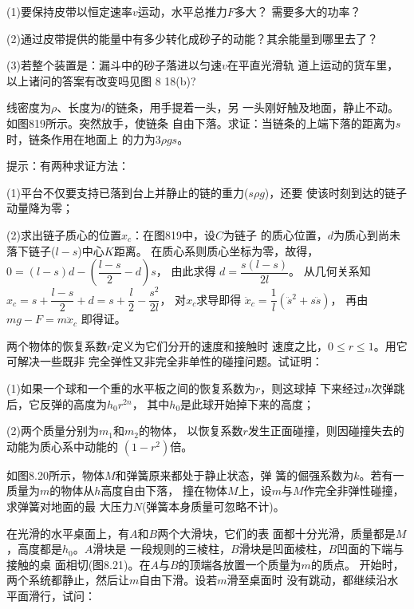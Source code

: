 \begin{exercises}
(1)要保持皮带以恒定速率$ v $运动，水平总推力$ F $多大？
需要多大的功率？

(2)通过皮带提供的能量中有多少转化成砂子的动能？其余能量到哪里去了？

(3)若整个装置是：漏斗中的砂子落进以匀速$ v $在平直光滑轨
道上运动的货车里，以上诸问的答案有改变吗\lhbrak 见图 8 18(b)\rhbrak ?

\exercise 线密度为$ \rho $、长度为$ l $的链条，用手提着一头，另
一头刚好触及地面，静止不动。如图819所示。突然放手，使链条
自由下落。求证：当链条的上端下落的距离为$ s $时，链条作用在地面上
的力为$ 3 \rho g s $。

\rhbrak 提示：有两种求证方法：

(1)平台不仅要支持已落到台上并静止的链的重力($ s \rho g $)，还要
使该时刻到达的链子动量降为零；

(2)求出链子质心的位置$ x _ { c } $：在图819中，设$ C $为链子
的质心位置，$ d $为质心到尚未落下链子($ l - s $)中心$ K $距离。
在质心系则质心坐标为零，故得，
$ 0 = \left( l - s \right) d - \left( \dfrac { l - s } { 2 } -d \right) s $，
由此求得
$ d = \dfrac { s \left( l - s \right) } { 2 l } $。
从几何关系知
$ x _ { c } = s + \dfrac { l - s } { 2 } + d = s + \dfrac { l } { 2 } - \dfrac { s ^ { 2 } } { 2 l } $，
对$ x _ { c } $求导即得
$ \ddot { x } _ { c } = \dfrac { 1 } { l }\left( \ddot { s } ^ 2 + s \ddot { s } \right)$，
再由$ m g - F = m \ddot { x } _ { c }$ 即得证\rhbrak 。

\exercise 两个物体的恢复系数$ r $定义为它们分开的速度和接触时
速度之比，$ 0 \leqslant r \leqslant 1 $。用它可解决一些既非
完全弹性又非完全非单性的碰撞问题。试证明：

(1)如果一个球和一个重的水平板之间的恢复系数为$ r $，则这球掉
下来经过$ n $次弹跳后，它反弹的高度为$ h _ { 0 } r ^ { 2 n } $，
其中$ h _ { 0 } $是此球开始掉下来的高度；

(2)两个质量分别为$ m _ { 1 } $和$ m _  { 2 } $的物体，
以恢复系数$ r $发生正面碰撞，则因碰撞失去的动能为质心系中动能的
$ \left( 1 - r ^ { 2 } \right) $倍。

\exercise 如图8.20所示，物体$ M $和弹簧原来都处于静止状态，弹
簧的倔强系数为$ k $。若有一质量为$ m $的物体从$ h $高度自由下落，
撞在物体$ M $上，设$ m $与$ M $作完全非弹性碰撞，求弹簧对地面的最
大压力$ N $(弹簧本身质量可忽略不计)。

\exercise 在光滑的水平桌面上，有$ A $和$ B $两个大滑块，它们的表
面都十分光滑，质量都是$ M $，高度都是$ h _ { 0 } $。$ A $滑块是
一段规则的三棱柱，$ B $滑块是凹面棱柱，$ B $凹面的下端与接触的桌
面相切(图8.21)。在$ A $与$ B $的顶端各放置一个质量为$ m $的质点。
开始时，两个系统都静止，然后让$ m $自由下滑。设若$ m $滑至桌面时
没有跳动，都继续沿水平面滑行，试问：


\end{exercises}
